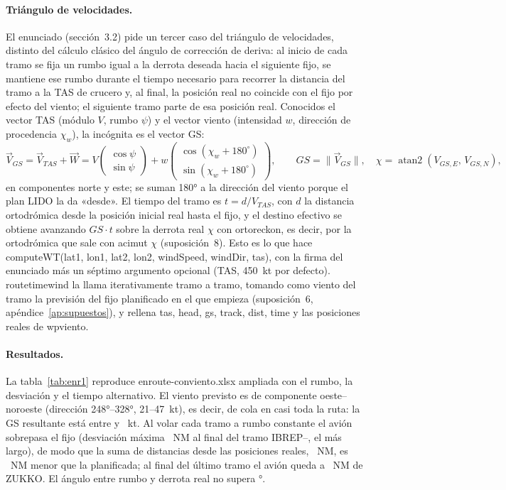 \documentclass[11pt,a4paper]{article}
\DeclareRobustCommand{\m}[1]{{\ttfamily\def\_{\textunderscore\penalty100\relax}#1}}
\begin{document}
\paragraph{Triángulo de velocidades.} El enunciado (sección~3.2) pide un tercer caso del triángulo de velocidades, distinto del cálculo clásico del ángulo de corrección de deriva: al inicio de cada tramo se fija un rumbo igual a la derrota deseada hacia el siguiente fijo, se mantiene ese rumbo durante el tiempo necesario para recorrer la distancia del tramo a la TAS de crucero y, al final, la posición real no coincide con el fijo por efecto del viento; el siguiente tramo parte de esa posición real. Conocidos el vector TAS (módulo $V$, rumbo $\psi$) y el vector viento (intensidad $w$, dirección de procedencia $\chi_w$), la incógnita es el vector GS:
\begin{equation}
\vec{V}_{GS} = \vec{V}_{TAS} + \vec{W} =
V\begin{pmatrix}\cos\psi\\ \sin\psi\end{pmatrix} + w\begin{pmatrix}\cos(\chi_w+180^\circ)\\ \sin(\chi_w+180^\circ)\end{pmatrix},\qquad
GS = \lVert\vec{V}_{GS}\rVert,\quad \chi = \operatorname{atan2}(V_{GS,E},\,V_{GS,N}),
\end{equation}
en componentes norte y este; se suman 180° a la dirección del viento porque el plan LIDO la da «desde». El tiempo del tramo es $t = d/V_{TAS}$, con $d$ la distancia ortodrómica desde la posición inicial real hasta el fijo, y el destino efectivo se obtiene avanzando $GS\cdot t$ sobre la derrota real $\chi$ con \m{orto\_reckon}, es decir, por la ortodrómica que sale con acimut $\chi$ (suposición~8). Esto es lo que hace \m{computeWT(lat1, lon1, lat2, lon2, windSpeed, windDir, tas)}, con la firma del enunciado más un séptimo argumento opcional (TAS, 450~kt por defecto). \m{route\_time\_wind} la llama iterativamente tramo a tramo, tomando como viento del tramo la previsión del fijo planificado en el que empieza (suposición~6, apéndice~\ref{ap:supuestos}), y rellena \m{tas}, \m{head}, \m{gs}, \m{track}, \m{dist}, \m{time} y las posiciones reales de \m{wp\_viento}.

\paragraph{Resultados.} La tabla~\ref{tab:enr1} reproduce \m{enroute-conviento.xlsx} ampliada con el rumbo, la desviación y el tiempo alternativo. El viento previsto es de componente oeste--noroeste (dirección 248°--328°, 21--47~kt), es decir, de cola en casi toda la ruta: la GS resultante está entre \enrGSmin{} y \enrGSmax~kt. Al volar cada tramo a rumbo constante el avión sobrepasa el fijo (desviación máxima \enrDevMax~NM al final del tramo IBREP--\enrDevMaxFix, el más largo), de modo que la suma de distancias desde las posiciones reales, \enrDistW~NM, es \enrDeltaD~NM menor que la planificada; al final del último tramo el avión queda a \enrDevZukko~NM de ZUKKO. El ángulo entre rumbo y derrota real no supera \enrWcaMax°.
\end{document}
